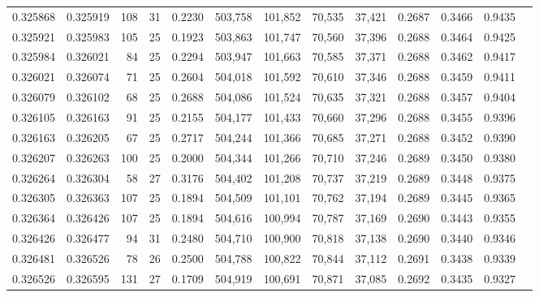 \begin{tabular}{rrrrrrrrrrrrr}
0.325868 & 0.325919 &   108 &  31 &                                     0.2230 & 503,758 & 101,852 &  70,535 &  37,421 & 0.2687 & 0.3466 & 0.9435 \\
0.325921 & 0.325983 &   105 &  25 &                                     0.1923 & 503,863 & 101,747 &  70,560 &  37,396 & 0.2688 & 0.3464 & 0.9425 \\
0.325984 & 0.326021 &    84 &  25 &                                     0.2294 & 503,947 & 101,663 &  70,585 &  37,371 & 0.2688 & 0.3462 & 0.9417 \\
0.326021 & 0.326074 &    71 &  25 &                                     0.2604 & 504,018 & 101,592 &  70,610 &  37,346 & 0.2688 & 0.3459 & 0.9411 \\
0.326079 & 0.326102 &    68 &  25 &                                     0.2688 & 504,086 & 101,524 &  70,635 &  37,321 & 0.2688 & 0.3457 & 0.9404 \\
0.326105 & 0.326163 &    91 &  25 &                                     0.2155 & 504,177 & 101,433 &  70,660 &  37,296 & 0.2688 & 0.3455 & 0.9396 \\
0.326163 & 0.326205 &    67 &  25 &                                     0.2717 & 504,244 & 101,366 &  70,685 &  37,271 & 0.2688 & 0.3452 & 0.9390 \\
0.326207 & 0.326263 &   100 &  25 &                                     0.2000 & 504,344 & 101,266 &  70,710 &  37,246 & 0.2689 & 0.3450 & 0.9380 \\
0.326264 & 0.326304 &    58 &  27 &                                     0.3176 & 504,402 & 101,208 &  70,737 &  37,219 & 0.2689 & 0.3448 & 0.9375 \\
0.326305 & 0.326363 &   107 &  25 &                                     0.1894 & 504,509 & 101,101 &  70,762 &  37,194 & 0.2689 & 0.3445 & 0.9365 \\
0.326364 & 0.326426 &   107 &  25 &                                     0.1894 & 504,616 & 100,994 &  70,787 &  37,169 & 0.2690 & 0.3443 & 0.9355 \\
0.326426 & 0.326477 &    94 &  31 &                                     0.2480 & 504,710 & 100,900 &  70,818 &  37,138 & 0.2690 & 0.3440 & 0.9346 \\
0.326481 & 0.326526 &    78 &  26 &                                     0.2500 & 504,788 & 100,822 &  70,844 &  37,112 & 0.2691 & 0.3438 & 0.9339 \\
0.326526 & 0.326595 &   131 &  27 &                                     0.1709 & 504,919 & 100,691 &  70,871 &  37,085 & 0.2692 & 0.3435 & 0.9327 \\

\end{tabular}
